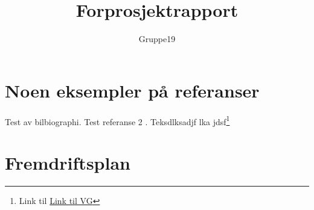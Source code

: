 \documentclass[11pt,a4paper,titlepage]{report}
\author{Gruppe19}
\title{Forprosjektrapport}
\begin{document}
\maketitle
\tableofcontents








\chapter{Noen eksempler på referanser}
Test av bilbiographi\cite{book:unixprog}.
Test referanse 2 \cite{book:unixprog2}.
Teksdlksadjf lka jdsf\footnote{Link til \href{www.vg.no}{Link til VG}}





\appendix
\chapter{Fremdriftsplan}
\end{document}
